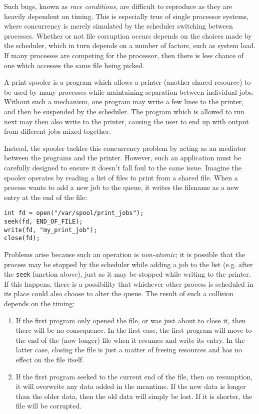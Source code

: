 Such bugs, known as \emph{race conditions}, are difficult to reproduce
as they are heavily dependent on timing.  This is especially true of
single processor systems, where concurrency is merely simulated by the
scheduler switching between processes.  Whether or not file corruption
occurs depends on the choices made by the scheduler, which in turn
depends on a number of factors, such as system load.  If many
processes are competing for the processor, then there is less chance
of one which accesses the same file being picked.

A print spooler is a program which allows a printer (another shared
resource) to be used by many processes while maintaining separation
between individual jobs.  Without such a mechanism, one program may
write a few lines to the printer, and then be suspended by the
scheduler.  The program which is allowed to run next may then also
write to the printer, causing the user to end up with output from
different jobs mixed together.

Instead, the spooler tackles this concurrency problem by acting as an
mediator between the programs and the printer.  However, such an
application must be carefully designed to ensure it doesn't fall foul
to the same issue.  Imagine the spooler operates by reading a list of
files to print from a shared file.  When a process wants to add a new
job to the queue, it writes the filename as a new entry at the end of
the file:

\begin{verbatim}
int fd = open("/var/spool/print_jobs");
seek(fd, END_OF_FILE);
write(fd, "my_print_job");
close(fd);
\end{verbatim}

Problems arise because such an operation is \emph{non-atomic}; it is
possible that the process may be stopped by the scheduler while adding
a job to the list (e.g. after the \texttt{seek} function above), just
as it may be stopped while writing to the printer.  If this happens,
there is a possibility that whichever other process is scheduled in
its place could also choose to alter the queue.  The result of such a
collision depends on the timing:

\begin{enumerate}
\item If the first program only opened the file, or was just about to
  close it, then there will be no consequence.  In the first case, the
  first program will move to the end of the (now longer) file when it
  resumes and write its entry.  In the latter case, closing the file
  is just a matter of freeing resources and has no effect on the file
  itself.
\item If the first program seeked to the current end of the file, then
  on resumption, it will overwrite any data added in the meantime.  If
  the new data is longer than the older data, then the old data will
  simply be lost.  If it is shorter, the file will be corrupted.
\end{enumerate}


